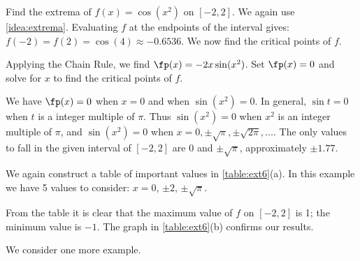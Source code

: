 \begin{example}\label{ex_extval6}
Find the extrema of  $f(x) = \cos (x^2)$ on $[-2,2]$.
\solution
We again use \autoref{idea:extrema}. Evaluating $f$ at the endpoints of the interval gives: $f(-2) = f(2) = \cos (4) \approx -0.6536.$ We now find the critical points of $f$.

Applying the Chain Rule, we find $\fp(x) = -2x\sin (x^2)$. Set $\fp(x) = 0$ and solve for $x$ to find the critical points of $f$. 

We have $\fp(x) = 0$ when $x = 0$ and when $\sin (x^2) = 0$. In general, $\sin t = 0$ when $t$ is a integer multiple of $\pi$.
Thus $\sin (x^2) = 0$ when $x^2$ is an integer multiple of $\pi$, and
$\sin (x^2)=0$ when $x=0, \pm\sqrt\pi, \pm\sqrt{2\pi}, \dotsc$. The only values to fall in the given interval of $[-2,2]$ are $0$ and $\pm\sqrt\pi$, approximately $\pm 1.77$.

We again construct a table of important values in \autoref{table:ext6}(a). In this example we have 5 values to consider: $x= 0$, $\pm 2$, $\pm\sqrt{\pi}$. 

From the table it is clear that the maximum value of $f$ on $[-2,2]$ is 1; the minimum value is $-1$. The graph in \autoref{table:ext6}(b) confirms our results.
\end{example}

We consider one more example.



